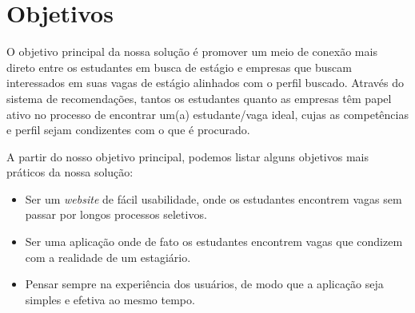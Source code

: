 \section{Objetivos}
O objetivo principal da nossa solução é promover um meio de conexão mais direto entre os estudantes em busca de estágio e empresas que buscam interessados em suas vagas de estágio alinhados com o perfil buscado. Através do sistema de recomendações, tantos os estudantes quanto as empresas têm papel ativo no processo de encontrar um(a) estudante/vaga ideal, cujas as competências e perfil sejam condizentes com o que é procurado.

A partir do nosso objetivo principal, podemos listar alguns objetivos mais práticos da nossa solução:

\begin{itemize}
	\item Ser um \emph{website} de fácil usabilidade, onde os estudantes encontrem vagas sem passar por longos processos seletivos.
	\item Ser uma aplicação onde de fato os estudantes encontrem vagas que condizem com a realidade de um estagiário.
	\item Pensar sempre na experiência dos usuários, de modo que a aplicação seja simples e efetiva ao mesmo tempo.
\end{itemize}